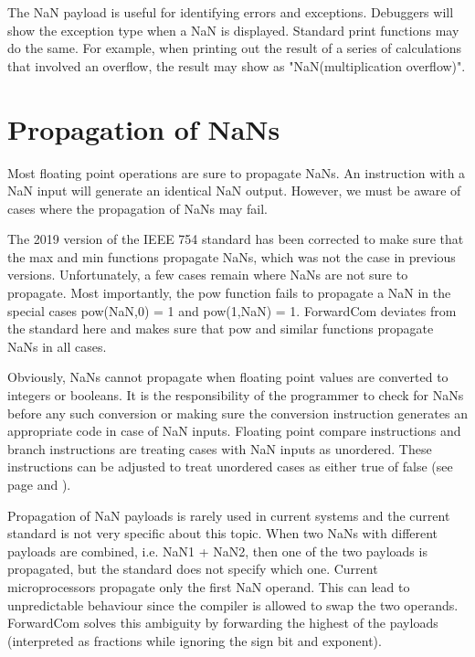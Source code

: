 \documentclass[forwardcom.tex]{subfiles}
\begin{document}
The NaN payload is useful for identifying errors and exceptions. Debuggers will show the exception type when a NaN is displayed. Standard print functions may do the same. For example, when printing out the result of a series of calculations that involved an overflow, the result may show as "NaN(multiplication overflow)".
\vv


\section{Propagation of NaNs}
\label{nanPropagation}

Most floating point operations are sure to propagate NaNs. An instruction with a NaN input will generate an identical NaN output. However, we must be aware of cases where the propagation of NaNs may fail. 
\vv

The 2019 version of the IEEE 754 standard has been corrected to make sure that the max and min functions propagate NaNs, which was not the case in previous versions. Unfortunately, a few cases remain where NaNs are not sure to propagate. Most importantly, the pow function fails to propagate a NaN in the special cases pow(NaN,0) = 1 and pow(1,NaN) = 1. ForwardCom deviates from the standard here and makes sure that pow and similar functions propagate NaNs in all cases.
\vv

Obviously, NaNs cannot propagate when floating point values are converted to integers or booleans. It is the responsibility of the programmer to check for NaNs before any such conversion or making sure the conversion instruction generates an appropriate code in case of NaN inputs. Floating point compare instructions and branch instructions are treating cases with NaN inputs as unordered. These instructions can be adjusted to treat unordered cases as either true of false (see page \pageref{table:conditionCodesForCompareInstruction} and \pageref{table:floatCompareJumpInstructions}).
\vv

Propagation of NaN payloads is rarely used in current systems and the current standard is not very specific about this topic. When two NaNs with different payloads are combined, i.e. NaN1 + NaN2, then one of the two payloads is propagated, but the standard does not specify which one. Current microprocessors propagate only the first NaN operand. This can lead to unpredictable behaviour since the compiler is allowed to swap the two operands. ForwardCom solves this ambiguity by forwarding the highest of the payloads (interpreted as fractions while ignoring the sign bit and exponent).
\vv
\end{document}
